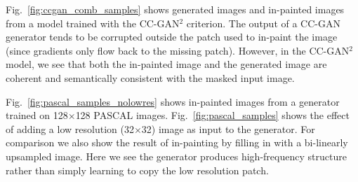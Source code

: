 \documentclass{article} %
\newcommand{\fig}[1]{Fig.~\ref{fig:#1}}
\begin{document}
\fig{ccgan_comb_samples} shows generated images and in-painted images
from a model trained with the CC-GAN$^2$ criterion.  The output of a
CC-GAN generator tends to be corrupted outside the patch used to
in-paint the image (since gradients only flow back to the missing patch). However, in the CC-GAN$^2$ model, we see that both the
in-painted image and the generated image are coherent and semantically
consistent with the masked input image.

\fig{pascal_samples_nolowres} shows in-painted images from a generator
trained on 128$\times$128 PASCAL images.  \fig{pascal_samples} shows
the effect of adding a low resolution (32$\times$32) image as input to
the generator.  For comparison we also show the result of in-painting
by filling in with a bi-linearly upsampled image.  Here we see the
generator produces high-frequency structure rather than simply learning to copy the low resolution patch.
\end{document}
